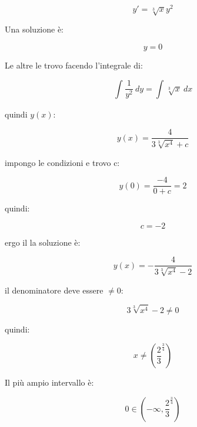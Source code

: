 \documentclass[../appunti-analisi.tex]{subfiles}
\begin{document}
\[
    y'=\sqrt[3]{x}y^{2}
\]

Una soluzione è:

\[
    y=0
\]

Le altre le trovo facendo l'integrale di:

\[
    \int_{}^{} { \frac{1}{y^{2}}} \: dy = \int_{}^{} {\sqrt[3]{x}} \: dx  
\]

quindi $y(x)$:

\[
    y(x)  = \frac{4}{3 \sqrt[3]{x^{4}}+c}
\]

impongo le condizioni e trovo c:

\[
    y(0) = \frac{-4}{0+c} = 2
\]

quindi:

\[
    c = -2
\]

ergo il la soluzione è:

\[
    y(x) = -\frac{4}{3 \sqrt[3]{x^{4}} - 2}
\]

il denominatore deve essere $\neq 0$:

\[
3 \sqrt[3]{x^{4}} - 2 \neq 0
\]

quindi:

\[
    x \neq (\frac{2}{3}^{ \frac{3}{4}})
\]

Il più ampio intervallo è:

\[
    0 \in (-\infty, \frac{2}{3}^{ \frac{3}{4}}) 
\]
\end{document}

